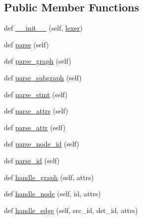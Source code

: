 \subsection*{Public Member Functions}
\begin{DoxyCompactItemize}
\item 
def \hyperlink{classsmacc__viewer_1_1xdot_1_1xdot__qt_1_1DotParser_a493dbc3c347549cd439bb1203b878411}{\+\_\+\+\_\+init\+\_\+\+\_\+} (self, \hyperlink{classsmacc__viewer_1_1xdot_1_1xdot__qt_1_1Parser_a849927c1fb4026f95914fd8e7b6d5065}{lexer})
\item 
def \hyperlink{classsmacc__viewer_1_1xdot_1_1xdot__qt_1_1DotParser_aa773d39d912ecad433e36e4e0addd8fe}{parse} (self)
\item 
def \hyperlink{classsmacc__viewer_1_1xdot_1_1xdot__qt_1_1DotParser_a5465e71c4bf4a6de15f014b1d27855fb}{parse\+\_\+graph} (self)
\item 
def \hyperlink{classsmacc__viewer_1_1xdot_1_1xdot__qt_1_1DotParser_ac71e76d074947d5d4929bdc699df9614}{parse\+\_\+subgraph} (self)
\item 
def \hyperlink{classsmacc__viewer_1_1xdot_1_1xdot__qt_1_1DotParser_aab4ab0bb958d2ff8e7f35ce9828eff88}{parse\+\_\+stmt} (self)
\item 
def \hyperlink{classsmacc__viewer_1_1xdot_1_1xdot__qt_1_1DotParser_af1efca86cd85a355e09fa7456b25c139}{parse\+\_\+attrs} (self)
\item 
def \hyperlink{classsmacc__viewer_1_1xdot_1_1xdot__qt_1_1DotParser_ab3eea2cffc30fd68114edb0e8960d4a6}{parse\+\_\+attr} (self)
\item 
def \hyperlink{classsmacc__viewer_1_1xdot_1_1xdot__qt_1_1DotParser_ace388b95579ee0b4b3ffb47449316912}{parse\+\_\+node\+\_\+id} (self)
\item 
def \hyperlink{classsmacc__viewer_1_1xdot_1_1xdot__qt_1_1DotParser_a7ed529e7510bac45a0df282195f3dfea}{parse\+\_\+id} (self)
\item 
def \hyperlink{classsmacc__viewer_1_1xdot_1_1xdot__qt_1_1DotParser_a8ebe4860b3a68c589e50a257d7e9e602}{handle\+\_\+graph} (self, attrs)
\item 
def \hyperlink{classsmacc__viewer_1_1xdot_1_1xdot__qt_1_1DotParser_a5e6de9a2df0e6c137311a42257d7f266}{handle\+\_\+node} (self, id, attrs)
\item 
def \hyperlink{classsmacc__viewer_1_1xdot_1_1xdot__qt_1_1DotParser_a04742e209550b8c2972d4ea199edfa76}{handle\+\_\+edge} (self, src\+\_\+id, dst\+\_\+id, attrs)
\end{DoxyCompactItemize}
